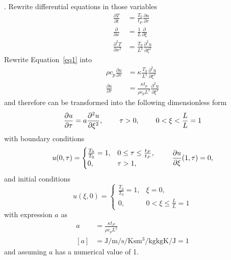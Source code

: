 \documentclass{article}
\begin{document}
. Rewrite differential equations in those variables
\begin{equation}
\begin{split}
    \frac{\partial T}{\partial t} &= \frac{T_0}{t_P} \frac{\partial u}{\partial \tau} \\
    \frac{\partial}{\partial x} &= \frac{1}{L} \frac{\partial}{\partial \xi} \\
    \frac{\partial^2 T}{\partial x^2} &= \frac{T_0}{L^2} \frac{\partial^2 u}{\partial \xi^2}
\end{split}
\end{equation}
Rewrite Equation~\ref{eq1} into
\begin{equation}
\begin{split}
    \rho c_p \frac{\partial u}{\partial \tau} &= \kappa \frac{T_0}{L^2} \frac{\partial^2 u}{\partial \xi^2} \\
    \frac{\partial u}{\partial \tau} &= \frac{\kappa t_p}{\rho c_p L^2} \frac{\partial^2 u}{\partial \xi^2}
\end{split}
\end{equation}
and therefore can be transformed into the following dimensionless form
\begin{equation}
    \frac{\partial u}{\partial \tau} = a \frac{\partial^2 u}{\partial \xi^2}, \hspace{0.8cm} \tau > 0, \hspace{0.8cm} 0 < \xi < \frac{L}{L}=1
\end{equation}
with boundary conditions
\begin{equation}   \label{BC}
   u(0,\tau)= 
\begin{cases}
    \frac{T_0}{T_0} = 1,           & 0 \leq \tau \leq \frac{t_P}{t_P}, \\
    0,              & \tau > 1,
\end{cases}
   \hspace{0.8cm}         \frac{\partial u}{\partial \xi}(1,\tau) = 0,
\end{equation}
and initial conditions
\begin{equation} 
   u(\xi,0) = 
\begin{cases}
    \frac{T_0}{T_0} = 1,           & \xi = 0, \\
    0,              & 0 < \xi \leq \frac{L}{L}=1
\end{cases}
\end{equation}
with expression $a$ as
\begin{equation}
\begin{split}
    a &= \frac{\kappa t_P}{\rho c_p L^2} \\
    [a] &= \si{\joule\per\meter\per\second\per\kelvin\second\meter\cubed\per\kilo\gram\kilo\gram\kelvin\per\joule}%
    = 1
\end{split}
\end{equation}
and assuming $a$ has a numerical value of 1.
\end{document}
